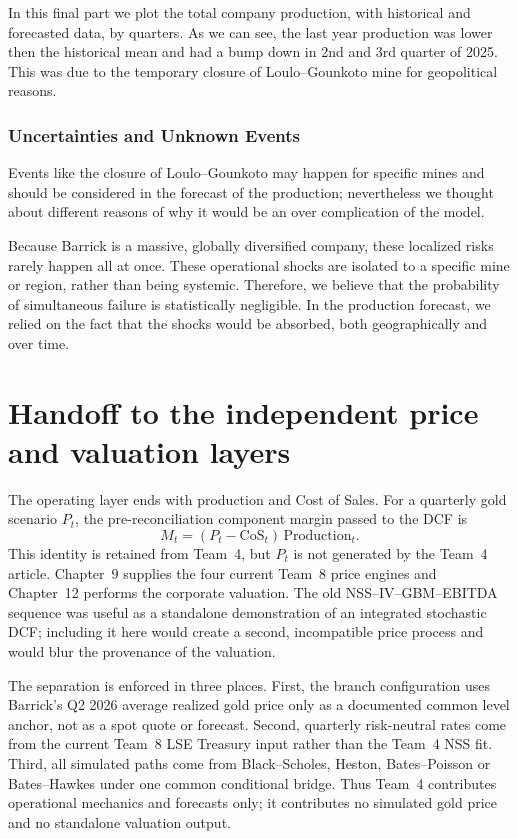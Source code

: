 In this final part we plot the total company production, with historical and forecasted data, by quarters. As we can see, the last year production was lower then the historical mean and had a bump down in 2nd and 3rd quarter of 2025. This was due to the temporary closure of Loulo--Gounkoto mine for geopolitical reasons. 



\subsubsection{Uncertainties and Unknown Events}
Events like the closure of Loulo--Gounkoto may happen for specific mines and should be considered in the forecast of the production; nevertheless we thought about different reasons of why it would be an over complication of the model. 

Because Barrick is a massive, globally diversified company, these localized risks rarely happen all at once. These operational shocks are isolated to a specific mine or region, rather than being systemic. Therefore, we believe that the probability of simultaneous failure is statistically negligible. In the production forecast, we relied on the fact that the shocks would be absorbed, both geographically and over time.


\section{Handoff to the independent price and valuation layers}

The operating layer ends with production and Cost of Sales. For a quarterly
gold scenario \(P_t\), the pre-reconciliation component margin passed to the
DCF is
\[
    M_t=(P_t-\mathrm{CoS}_t)\,\mathrm{Production}_t .
\]
This identity is retained from Team~4, but \(P_t\) is not generated by the
Team~4 article. Chapter~9 supplies the four current Team~8 price engines and
Chapter~12 performs the corporate valuation. The old NSS--IV--GBM--EBITDA
sequence was useful as a standalone demonstration of an integrated stochastic
DCF; including it here would create a second, incompatible price process and
would blur the provenance of the valuation.

The separation is enforced in three places. First, the branch configuration
uses Barrick's Q2 2026 average realized gold price only as a documented common
level anchor, not as a spot quote or forecast. Second, quarterly risk-neutral
rates come from the current Team~8 LSE Treasury input rather than the Team~4
NSS fit. Third, all simulated paths come from Black--Scholes, Heston,
Bates--Poisson or Bates--Hawkes under one common conditional bridge. Thus
Team~4 contributes operational mechanics and forecasts only; it contributes
no simulated gold price and no standalone valuation output.

